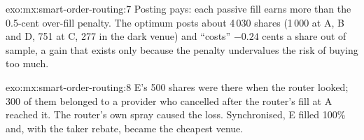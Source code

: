 \begin{solution}{exo:mx:smart-order-routing:7}
Posting pays: each passive fill earns more than the 0.5-cent over-fill penalty. The optimum posts about 4\,030 shares (1\,000 at A, B and D, 751 at C,
277 in the dark venue) and ``costs'' $-0.24$ cents a share out of sample, a gain that exists only because the penalty undervalues the risk of buying
too much.
\end{solution}

\begin{solution}{exo:mx:smart-order-routing:8}
E's 500 shares were there when the router looked; 300 of them belonged to a provider who cancelled after the router's fill at A reached it. The
router's own spray caused the loss. Synchronised, E filled 100\% and, with the taker rebate, became the cheapest venue.
\end{solution}


